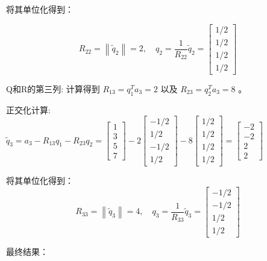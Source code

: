 \begin{example}
将其单位化得到：

$$
R_{22}=\left\|\tilde{q}_{2}\right\|=2, \quad q_{2}=\frac{1}{R_{22}} \tilde{q}_{2}=\left[\begin{array}{c}
1 / 2 \\
1 / 2 \\
1 / 2 \\
1 / 2
\end{array}\right]
$$

Q和R的第三列:
计算得到 $R_{13}=q_{1}^{T} a_{3}=2$ 以及 $R_{23}=q_{2}^{T} a_{3}=8$ 。

正交化计算:
$\tilde{q}_{3}=a_{3}-R_{13} q_{1}-R_{23} q_{2}=\left[\begin{array}{l}1 \\ 3 \\ 5 \\ 7\end{array}\right]-2\left[\begin{array}{r}-1 / 2 \\ 1 / 2 \\ -1 / 2 \\ 1 / 2\end{array}\right]-8\left[\begin{array}{l}1 / 2 \\ 1 / 2 \\ 1 / 2 \\ 1 / 2\end{array}\right]=\left[\begin{array}{r}-2 \\ -2 \\ 2 \\ 2\end{array}\right]$

将其单位化得到：
$$
R_{33}=\left\|\tilde{q}_{3}\right\|=4, \quad q_{3}=\frac{1}{R_{33}} \tilde{q}_{3}=\left[\begin{array}{c}
-1 / 2 \\
-1 / 2 \\
1 / 2 \\
1 / 2
\end{array}\right]
$$

最终结果：


\end{example}
